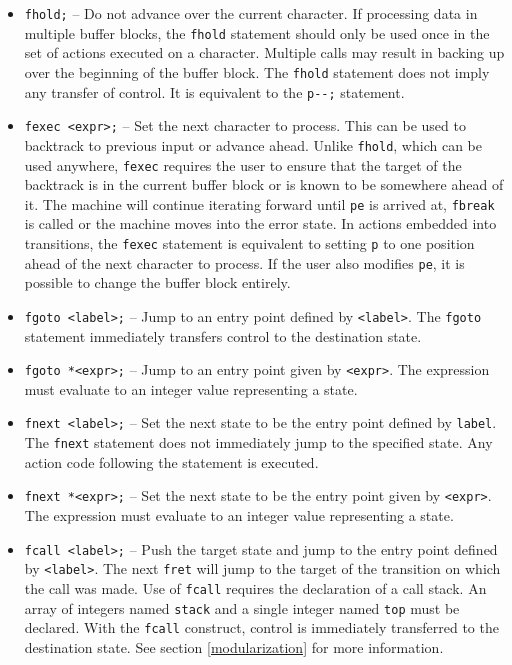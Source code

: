 \documentclass[letterpaper,11pt,oneside]{book}
\begin{document}
\begin{itemize}

\item \verb|fhold;| -- Do not advance over the current character. If processing
data in multiple buffer blocks, the \verb|fhold| statement should only be used
once in the set of actions executed on a character.  Multiple calls may result
in backing up over the beginning of the buffer block. The \verb|fhold|
statement does not imply any transfer of control. It is equivalent to the
\verb|p--;| statement. 

\item \verb|fexec <expr>;| -- Set the next character to process. This can be
used to backtrack to previous input or advance ahead.
Unlike \verb|fhold|, which can be used
anywhere, \verb|fexec| requires the user to ensure that the target of the
backtrack is in the current buffer block or is known to be somewhere ahead of
it. The machine will continue iterating forward until \verb|pe| is arrived at,
\verb|fbreak| is called or the machine moves into the error state. In actions
embedded into transitions, the \verb|fexec| statement is equivalent to setting
\verb|p| to one position ahead of the next character to process.  If the user
also modifies \verb|pe|, it is possible to change the buffer block entirely.

\item \verb|fgoto <label>;| -- Jump to an entry point defined by
\verb|<label>|.  The \verb|fgoto| statement immediately transfers control to
the destination state.

\item \verb|fgoto *<expr>;| -- Jump to an entry point given by \verb|<expr>|.
The expression must evaluate to an integer value representing a state.

\item \verb|fnext <label>;| -- Set the next state to be the entry point defined
by \verb|label|.  The \verb|fnext| statement does not immediately jump to the
specified state. Any action code following the statement is executed.

\item \verb|fnext *<expr>;| -- Set the next state to be the entry point given
by \verb|<expr>|. The expression must evaluate to an integer value representing
a state.

\item \verb|fcall <label>;| -- Push the target state and jump to the entry
point defined by \verb|<label>|.  The next \verb|fret| will jump to the target
of the transition on which the call was made. Use of \verb|fcall| requires
the declaration of a call stack. An array of integers named \verb|stack| and a
single integer named \verb|top| must be declared. With the \verb|fcall|
construct, control is immediately transferred to the destination state.
See section \ref{modularization} for more information.


\end{itemize}
\end{document}
